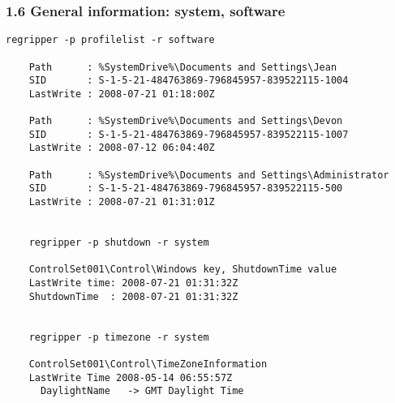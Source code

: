 \begin{frame}[fragile]
  \frametitle{1.6 General information: system, software}
  \begin{lstlisting}[basicstyle=\tiny]
    regripper -p profilelist -r software

	Path      : %SystemDrive%\Documents and Settings\Jean
	SID       : S-1-5-21-484763869-796845957-839522115-1004
	LastWrite : 2008-07-21 01:18:00Z

	Path      : %SystemDrive%\Documents and Settings\Devon
	SID       : S-1-5-21-484763869-796845957-839522115-1007
	LastWrite : 2008-07-12 06:04:40Z

	Path      : %SystemDrive%\Documents and Settings\Administrator
	SID       : S-1-5-21-484763869-796845957-839522115-500
	LastWrite : 2008-07-21 01:31:01Z


    regripper -p shutdown -r system 

	ControlSet001\Control\Windows key, ShutdownTime value
	LastWrite time: 2008-07-21 01:31:32Z
	ShutdownTime  : 2008-07-21 01:31:32Z


    regripper -p timezone -r system

	ControlSet001\Control\TimeZoneInformation
	LastWrite Time 2008-05-14 06:55:57Z
	  DaylightName   -> GMT Daylight Time
  \end{lstlisting}
\end{frame}


